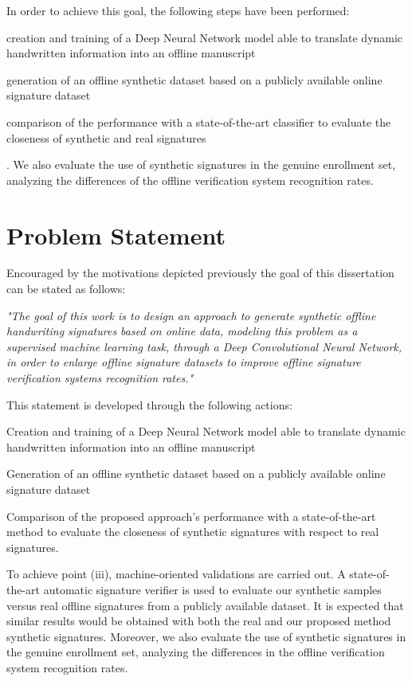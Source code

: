 In order to achieve this goal, the following steps have been performed:
\begin{inlinelist}
	\item creation and training of a Deep Neural Network model able to translate dynamic handwritten information into an offline manuscript
	\item generation of an offline synthetic dataset based on a publicly available online signature dataset
	\item comparison of the performance with a state-of-the-art classifier to evaluate the closeness of synthetic and real signatures
\end{inlinelist}. We also evaluate the use of synthetic signatures in the genuine enrollment set, analyzing the differences of the offline verification system recognition rates.

\section{Problem Statement}
Encouraged by the motivations depicted previously the goal of this dissertation can be stated as follows:

\textit{"The goal of this work is to design an approach to generate synthetic offline handwriting signatures based on online data, modeling this problem as a supervised machine learning task, through a Deep Convolutional Neural Network, in order to enlarge offline signature datasets to improve offline signature verification systems recognition rates."}

This statement is developed through the following actions:
\begin{inlinelist}
\item Creation and training of a Deep Neural Network model able to translate dynamic handwritten information into an offline manuscript
\item Generation of an offline synthetic dataset based on a publicly available online signature dataset
\item Comparison of the proposed approach’s performance with a state-of-the-art method to evaluate the closeness of synthetic signatures with respect to real signatures. 
\end{inlinelist}

To achieve point (iii), machine-oriented validations are carried out. A state-of-the-art automatic signature verifier is used to evaluate our synthetic samples versus real offline signatures from a publicly available dataset. It is expected that similar results would be obtained with both the real and our proposed method synthetic signatures. Moreover, we also evaluate the use of synthetic signatures in the genuine enrollment set, analyzing the differences in the offline verification system recognition rates. 

